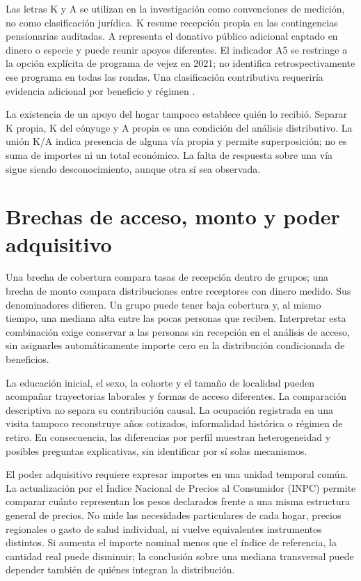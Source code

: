 Las letras K y A se utilizan en la investigación como convenciones de
medición, no como clasificación jurídica. K resume recepción propia en las
contingencias pensionarias auditadas. A representa el donativo público
adicional captado en dinero o especie y puede reunir apoyos diferentes.
El indicador A5 se restringe a la opción explícita de programa de vejez en
2021; no identifica retrospectivamente ese programa en todas las rondas.
Una clasificación contributiva requeriría evidencia adicional por beneficio
y régimen \citep{inegi2018k,inegi2021k}.

La existencia de un apoyo del hogar tampoco establece quién lo recibió.
Separar K propia, K del cónyuge y A propia es una condición del análisis
distributivo. La unión K/A indica presencia de alguna vía propia y permite
superposición; no es suma de importes ni un total económico. La falta de
respuesta sobre una vía sigue siendo desconocimiento, aunque otra sí sea
observada.

\section{Brechas de acceso, monto y poder adquisitivo}

Una brecha de cobertura compara tasas de recepción dentro de grupos; una
brecha de monto compara distribuciones entre receptores con dinero medido.
Sus denominadores difieren. Un grupo puede tener baja cobertura y, al mismo
tiempo, una mediana alta entre las pocas personas que reciben. Interpretar
esta combinación exige conservar a las personas sin recepción en el análisis
de acceso, sin asignarles automáticamente importe cero en la distribución
condicionada de beneficios.

La educación inicial, el sexo, la cohorte y el tamaño de localidad pueden
acompañar trayectorias laborales y formas de acceso diferentes. La comparación
descriptiva no separa su contribución causal. La ocupación registrada en una
visita tampoco reconstruye años cotizados, informalidad histórica o régimen
de retiro. En consecuencia, las diferencias por perfil muestran heterogeneidad
y posibles preguntas explicativas, sin identificar por sí solas mecanismos.

El poder adquisitivo requiere expresar importes en una unidad temporal común.
La actualización por el Índice Nacional de Precios al Consumidor (INPC) permite comparar cuánto representan los pesos
declarados frente a una misma estructura general de precios. No mide las
necesidades particulares de cada hogar, precios regionales o gasto de salud
individual, ni vuelve equivalentes instrumentos distintos. Si aumenta el
importe nominal menos que el índice de referencia, la cantidad real puede
disminuir; la conclusión sobre una mediana transversal puede depender también
de quiénes integran la distribución.

